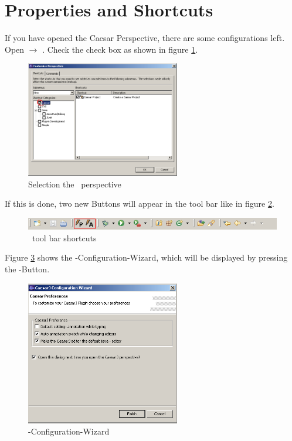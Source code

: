 \section{Properties and Shortcuts}
If you have opened the Caesar Perspective, there are some configurations left. Open  $\rightarrow$ . Check the  check box as shown in figure \ref{fig:propert}.

\begin{figure}[htbp]
	\centering
		\includegraphics[width=0.60\textwidth]{images/propert.png}
	\caption{Selection the \caesarj ~perspective}
	\label{fig:propert}
\end{figure}

If this is done, two new Buttons will appear in the tool bar like in figure \ref{fig:toolbar}.

\begin{figure}[htbp]
	\centering
		\includegraphics[width=1.0\textwidth]{images/toolbar.png}
	\caption{\caesarj ~tool bar shortcuts}
	\label{fig:toolbar}
\end{figure}

Figure \ref{fig:properties} shows the \caesarj -Configuration-Wizard, which will be displayed by pressing the -Button.

\begin{figure}[htbp]
	\centering
		\includegraphics[width=0.60\textwidth]{images/view_properties.png}
	\caption{\caesarj -Configuration-Wizard}
	\label{fig:properties}
\end{figure}

